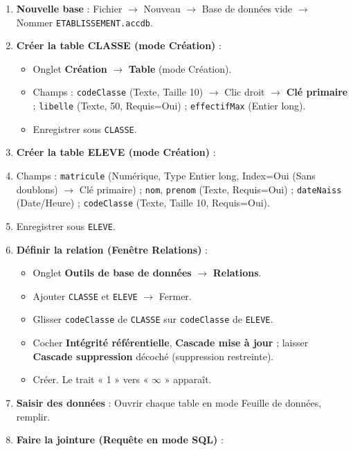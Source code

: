 \documentclass[11pt]{article}
\begin{document}
\begin{methode}
\begin{enumerate}
\item \textbf{Nouvelle base} : Fichier $\rightarrow$ Nouveau $\rightarrow$ Base de données vide $\rightarrow$ Nommer \texttt{ETABLISSEMENT.accdb}.
\item \textbf{Créer la table CLASSE (mode Création)} :
  \begin{itemize}
  \item Onglet \textbf{Création} $\rightarrow$ \textbf{Table} (mode Création).
  \item Champs : \texttt{codeClasse} (Texte, Taille 10) $\rightarrow$ Clic droit $\rightarrow$ \textbf{Clé primaire} ; \texttt{libelle} (Texte, 50, Requis=Oui) ; \texttt{effectifMax} (Entier long).
  \item Enregistrer sous \texttt{CLASSE}.
  \end{itemize}
\item \textbf{Créer la table ELEVE (mode Création)} :
  \item Champs : \texttt{matricule} (Numérique, Type Entier long, Index=Oui (Sans doublons) $\rightarrow$ Clé primaire) ; \texttt{nom}, \texttt{prenom} (Texte, Requis=Oui) ; \texttt{dateNaiss} (Date/Heure) ; \texttt{codeClasse} (Texte, Taille 10, Requis=Oui).
  \item Enregistrer sous \texttt{ELEVE}.
\item \textbf{Définir la relation (Fenêtre Relations)} :
  \begin{itemize}
  \item Onglet \textbf{Outils de base de données} $\rightarrow$ \textbf{Relations}.
  \item Ajouter \texttt{CLASSE} et \texttt{ELEVE} $\rightarrow$ Fermer.
  \item Glisser \texttt{codeClasse} de \texttt{CLASSE} sur \texttt{codeClasse} de \texttt{ELEVE}.
  \item Cocher \textbf{Intégrité référentielle}, \textbf{Cascade mise à jour} ; laisser \textbf{Cascade suppression} décoché (suppression restreinte).
  \item Créer. Le trait « 1 » vers « $\infty$ » apparaît.
  \end{itemize}
\item \textbf{Saisir des données} : Ouvrir chaque table en mode Feuille de données, remplir.
\item \textbf{Faire la jointure (Requête en mode SQL)} :
  \begin{itemize}

\end{itemize}
\end{enumerate}
\end{methode}
\end{document}
